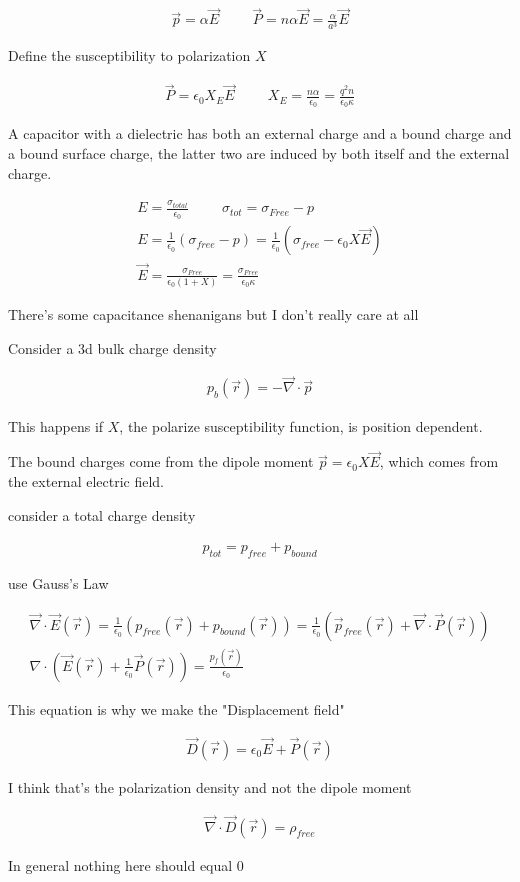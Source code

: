 \documentclass[fleqn]{report}
\newcommand{\hp}{\hspace{1cm}}
\newcommand{\equations} [1] {
\begin{gather*}
#1
\end{gather*}
}
\begin{document}
\equations{
    \vec p = \alpha \vec E 
    \hp 
    \vec P = n \alpha \vec E 
    =
    \frac{\alpha}{a^3} \vec E 
}
Define the susceptibility to polarization $X$ 
\equations{
    \vec P = \epsilon_0 X_E \vec E 
    \hp 
    X_E = \frac{n \alpha}{\epsilon_0}
    =
    \frac{q^2 n}{\epsilon_0 \kappa}
}

A capacitor with a dielectric has both an external charge and a bound 
charge and a bound surface charge, the latter two are induced by both itself 
and the external charge. 

\equations{
    E = \frac{\sigma_{total}}{\epsilon_0}
    \hp 
    \sigma_{tot} = \sigma_{Free} - p 
    \\
    E = \frac{1}{\epsilon_0}
    \left(
        \sigma_{free} - p
    \right)
    =
    \frac{1}{\epsilon_0}
    \left(
        \sigma_{free} - \epsilon_0 X \vec E 
    \right)
    \\
    \vec E 
    = 
    \frac{\sigma_{Free}}{\epsilon_0 (1 + X)}
    =
    \frac{\sigma_{Free}}{\epsilon_0 \kappa }
}

There's some capacitance shenanigans but I don't really care at all 

Consider a 3d bulk charge density 
\equations{
    p_b(\vec r) = - \vec \nabla \cdot \vec p 
}
This happens if $X$, the polarize susceptibility function, is position dependent. 

The bound charges come from the dipole moment $\vec p = \epsilon_0 X \vec E$, 
which comes from the external electric field. 

consider a total charge density 
\equations{
    p_{tot} = p_{free} + p_{bound}
}

use Gauss's Law 
\equations{
    \vec \nabla \cdot \vec E(\vec r)
    =
    \frac{1}{\epsilon_0}
    \left(
        p_{free}(\vec r) + p_{bound}(\vec r)
    \right)
    =
    \frac{1}{\epsilon_0}
    \left(
        \vec p_{free}(\vec r) + \vec \nabla \cdot \vec P(\vec r)
    \right)
    \\
    \nabla \cdot 
    \left(
        \vec E(\vec r) + \frac{1}{\epsilon_0} \vec P(\vec r)
    \right)
    =
    \frac{p_f(\vec r)}{\epsilon_0}
}

This equation is why we make the "Displacement field"

\equations{
    \vec D(\vec r)
    =
    \epsilon_0 \vec E + \vec P(\vec r)
}
I think that's the polarization density and not the dipole moment 

\equations{
    \vec \nabla \cdot \vec D(\vec r) = \rho_{free}
}
In general nothing here should equal 0
\end{document}
